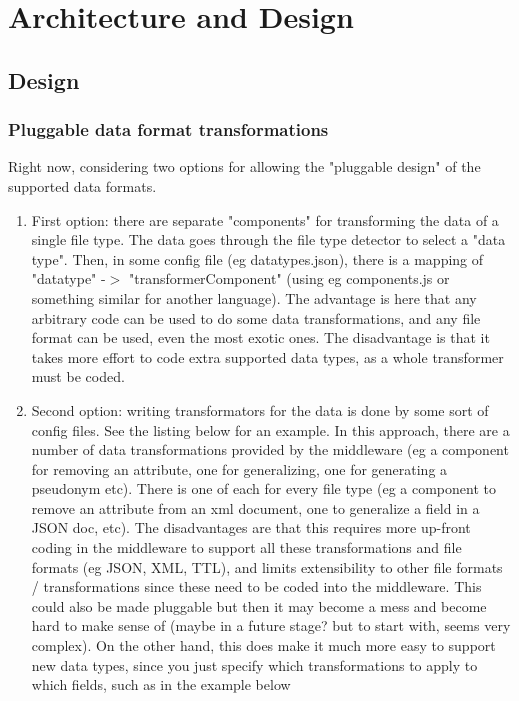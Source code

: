 \chapter{Architecture and Design}
\section{Design}

\subsection{Pluggable data format transformations}
Right now, considering two options for allowing the "pluggable design" of the supported data formats. 
\begin{enumerate}[label=(\alph*)]
\item First option: there are separate "components" for transforming the data of a single file type. The data goes through the file type detector to select a "data type". Then, in some config file (eg datatypes.json), there is a mapping of "datatype" -$>$ "transformerComponent" (using eg components.js or something similar for another language). The advantage is here that any arbitrary code can be used to do some data transformations, and any file format can be used, even the most exotic ones. The disadvantage is that it takes more effort to code extra supported data types, as a whole transformer must be coded.
\item Second option: writing transformators for the data is done by some sort of config files. See the listing below for an example. In this approach, there are a number of data transformations provided by the middleware (eg a component for removing an attribute, one for generalizing, one for generating a pseudonym etc). There is one of each for every file type (eg a component to remove an attribute from an xml document, one to generalize a field in a JSON doc, etc). The disadvantages are that this requires more up-front coding in the middleware to support all these transformations and file formats (eg JSON, XML, TTL), and limits extensibility to other file formats / transformations since these need to be coded into the middleware. This could also be made pluggable but then it may become a mess and become hard to make sense of (maybe in a future stage? but to start with, seems very complex). On the other hand, this does make it much more easy to support new data types, since you just specify which transformations to apply to which fields, such as in the example below
\end{enumerate}

